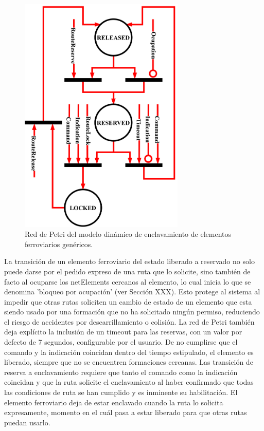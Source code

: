 	\begin{figure}[H]
		\centering
		\includegraphics[width=0.7\textwidth]{Figuras/INT_petri}
		\centering\caption{Red de Petri del modelo dinámico de enclavamiento de elementos ferroviarios genéricos.}
		\label{fig:Interlocking_petri}
	\end{figure}
	
	La transición de un elemento ferroviario del estado liberado a reservado no solo puede darse por el pedido expreso de una ruta que lo solicite, sino también de facto al ocuparse los netElements cercanos al elemento, lo cual inicia lo que se denomina 'bloqueo por ocupación' (ver Sección XXX). Esto protege al sistema al impedir que otras rutas soliciten un cambio de estado de un elemento que esta siendo usado por una formación que no ha solicitado ningún permiso, reduciendo el riesgo de accidentes por descarrillamiento o colisión. La red de Petri también deja explícito la inclusión de un timeout para las reservas, con un valor por defecto de 7 segundos, configurable por el usuario. De no cumplirse que el comando y la indicación coincidan dentro del tiempo estipulado, el elemento es liberado, siempre que no se encuentren formaciones cercanas. Las transición de reserva a enclavamiento requiere que tanto el comando como la indicación coincidan y que la ruta solicite el enclavamiento al haber confirmado que todas las condiciones de ruta se han cumplido y es inminente su habilitación. El elemento ferroviario deja de estar enclavado cuando la ruta lo solicita expresamente, momento en el cuál pasa a estar liberado para que otras rutas puedan usarlo.
	
